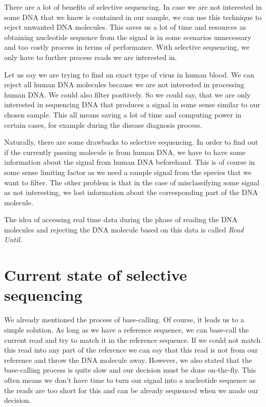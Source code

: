There are a lot of benefits of selective sequencing. In case we are not interested
in some DNA that we know is contained in our sample, we can use this technique to
reject unwanted DNA molecules. This saves us a lot of time and resources as obtaining
nucleotide sequence from the signal is in some scenarios unnecessary and too
costly process in terms of performance. With selective sequencing, we only have
to further process reads we are interested in.

Let us say we are trying to find an exact type of virus in human blood. We can
reject all human DNA molecules because we are not interested in processing human
DNA. We could also filter positively. So we could say, that we are only
interested in sequencing DNA that produces a signal in some sense similar to our
chosen sample. This all means saving a lot of time and computing power in certain
cases, for example during the disease diagnosis process.

Naturally, there are some drawbacks to selective sequencing. In order to find out
if the currently passing molecule is from human DNA, we have to have some information
about the signal from human DNA beforehand.
This is of course in some sense limiting factor as we need a sample signal from
the species that we want to filter. The other problem is that in the case of misclassifying
some signal as not interesting, we lost information about the corresponding
part of the DNA molecule.

The idea of accessing real time data during the phase of reading the DNA molecules
and rejecting the DNA molecule based on this data is called \textit{Read Until}. 

\section{Current state of selective sequencing}


We already mentioned the process of base-calling. Of course, it leads us to a simple
solution. As long as we have a reference sequence, we can base-call the current read
and try to match it in the reference sequence. If we could not match this read
into any part of the reference we can say that this read is not from our reference
and throw the DNA molecule away. However, we also stated that the base-calling process
is quite slow and our decision must be done on-the-fly. This often means we don't
have time to turn our signal into a nucleotide sequence as the reads are too short for this
and can be already sequenced when we made our decision.

